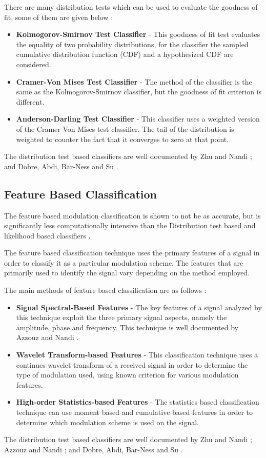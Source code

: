 \documentclass[10pt,twocolumn]{witseiepaper}
\begin{document}
	There are many distribution tests which can be used to evaluate the goodness of fit, some of them are given below \cite{zhu2014automatic}:
	\begin{itemize}
		\item \textbf{Kolmogorov-Smirnov Test Classifier} - This goodness of fit test evaluates the equality of two probability distributions, for the classifier the sampled cumulative distribution function (CDF) and a hypothesized CDF are considered.
		\item \textbf{Cramer-Von Mises Test Classifier} - The method of the classifier is the same as the Kolmogorov-Smirnov classifier, but the goodness of fit criterion is different.
		\item \textbf{Anderson-Darling Test Classifier} - This classifier uses a weighted version of the Cramer-Von Mises test classifier. The tail of the distribution is weighted to counter the fact that it converges to zero at that point.
	\end{itemize}
	The distribution test based classifiers are well documented by Zhu and Nandi \cite{zhu2014automatic}; and Dobre, Abdi, Bar-Ness and Su \cite{dobre2007survey}.

	\subsection{Feature Based Classification}
	\label{subsec:feature}
	
	The feature based modulation classification is shown to not be as accurate, but is significantly less computationally intensive than the Distribution test based and likelihood based classifiers \cite{zhu2014automatic}.
	
	The feature based classification technique uses the primary features of a signal in order to classify it as a particular modulation scheme. The features that are primarily used to identify the signal vary depending on the method employed.
	
	The main methods of feature based classification are as follows \cite{zhu2014automatic}: 
	\begin{itemize}
		\item \textbf{Signal Spectral-Based Features} - The key features of a signal analyzed by this technique exploit the three primary signal aspects, namely the amplitude, phase and frequency. This technique is well documented by Azzouz and Nandi \cite{azzouz2013automatic}.
		\item \textbf{Wavelet Transform-based Features} - This classification technique uses a continues wavelet transform of a received signal in order to determine the type of modulation used, using known criterion for various modulation features.
		\item \textbf{High-order Statistics-based Features} - The statistics based classification technique can use moment based and cumulative based features in order to determine which modulation scheme is used on the signal.
	\end{itemize}
	The distribution test based classifiers are well documented by Zhu and Nandi \cite{zhu2014automatic}; Azzouz and Nandi \cite{azzouz2013automatic}; and Dobre, Abdi, Bar-Ness and Su \cite{dobre2007survey}.
\end{document}
